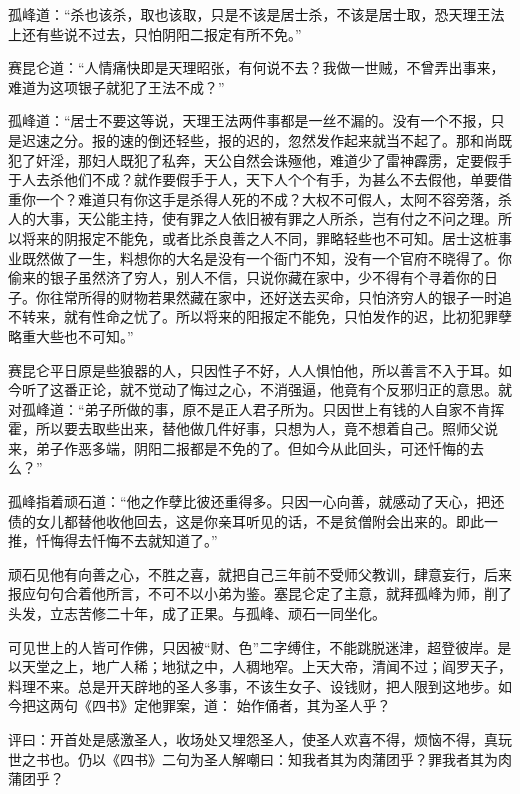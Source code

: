 \documentclass[a4paper,12pt,UTF8,twoside]{ctexbook}
\begin{document}
孤峰道：“杀也该杀，取也该取，只是不该是居士杀，不该是居士取，恐天理王法上还有些说不过去，只怕阴阳二报定有所不免。”

赛昆仑道：“人情痛快即是天理昭张，有何说不去？我做一世贼，不曾弄出事来，难道为这项银子就犯了王法不成？”

孤峰道：“居士不要这等说，天理王法两件事都是一丝不漏的。没有一个不报，只是迟速之分。报的速的倒还轻些，报的迟的，忽然发作起来就当不起了。那和尚既犯了奸淫，那妇人既犯了私奔，天公自然会诛殛他，难道少了雷神霹雳，定要假手于人去杀他们不成？就作要假手于人，天下人个个有手，为甚么不去假他，单要借重你一个？难道只有你这手是杀得人死的不成？大权不可假人，太阿不容旁落，杀人的大事，天公能主持，使有罪之人依旧被有罪之人所杀，岂有付之不问之理。所以将来的阴报定不能免，或者比杀良善之人不同，罪略轻些也不可知。居士这桩事业既然做了一生，料想你的大名是没有一个衙门不知，没有一个官府不晓得了。你偷来的银子虽然济了穷人，别人不信，只说你藏在家中，少不得有个寻着你的日子。你往常所得的财物若果然藏在家中，还好送去买命，只怕济穷人的银子一时追不转来，就有性命之忧了。所以将来的阳报定不能免，只怕发作的迟，比初犯罪孽略重大些也不可知。”

赛昆仑平日原是些狼器的人，只因性子不好，人人惧怕他，所以善言不入于耳。如今听了这番正论，就不觉动了悔过之心，不消强逼，他竟有个反邪归正的意思。就对孤峰道：“弟子所做的事，原不是正人君子所为。只因世上有钱的人自家不肯挥霍，所以要去取些出来，替他做几件好事，只想为人，竟不想着自己。照师父说来，弟子作恶多端，阴阳二报都是不免的了。但如今从此回头，可还忏悔的去么？”

孤峰指着顽石道：“他之作孽比彼还重得多。只因一心向善，就感动了天心，把还债的女儿都替他收他回去，这是你亲耳听见的话，不是贫僧附会出来的。即此一推，忏悔得去忏悔不去就知道了。”

顽石见他有向善之心，不胜之喜，就把自己三年前不受师父教训，肆意妄行，后来报应句句合着他所言，不可不以小弟为鉴。塞昆仑定了主意，就拜孤峰为师，削了头发，立志苦修二十年，成了正果。与孤峰、顽石一同坐化。

可见世上的人皆可作佛，只因被“财、色”二字缚住，不能跳脱迷津，超登彼岸。是以天堂之上，地广人稀；地狱之中，人稠地窄。上天大帝，清闻不过；阎罗天子，料理不来。总是开天辟地的圣人多事，不该生女子、设钱财，把人限到这地步。如今把这两句《四书》定他罪案，道： 始作俑者，其为圣人乎？

评曰：开首处是感激圣人，收场处又埋怨圣人，使圣人欢喜不得，烦恼不得，真玩世之书也。仍以《四书》二句为圣人解嘲曰：知我者其为肉蒲团乎？罪我者其为肉蒲团乎？
\end{document}
